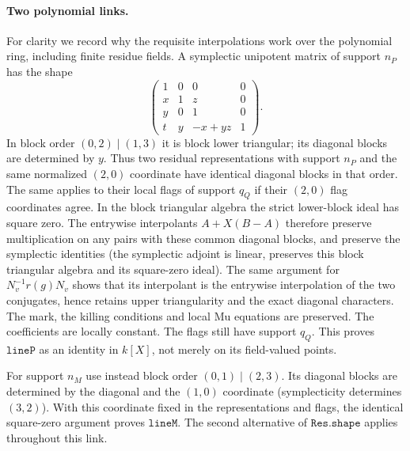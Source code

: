 \paragraph{Two polynomial links.}
For clarity we record why the requisite interpolations work
over the polynomial ring, including finite residue fields.
A symplectic unipotent matrix of support \(n_P\) has the shape
\[
 \begin{pmatrix}
 1&0&0&0\\x&1&z&0\\y&0&1&0\\t&y&-x+yz&1
 \end{pmatrix}.
\]
In block order \((0,2)\mid(1,3)\) it is block lower triangular;
its diagonal blocks are determined by \(y\). Thus two
residual representations with support \(n_P\) and the
same normalized \((2,0)\) coordinate have identical
diagonal blocks in that order. The same applies to their
local flags of support \(q_Q\) if their \((2,0)\) flag
coordinates agree. In the block triangular algebra the
strict lower-block ideal has square zero. The entrywise
interpolants \(A+X(B-A)\) therefore preserve multiplication
on any pairs with these common diagonal blocks, and preserve
the symplectic identities (the symplectic adjoint is linear,
preserves this block triangular algebra and its square-zero
ideal). The same argument for \(N_v^{-1}r(g)N_v\) shows
that its interpolant is the entrywise interpolation of the
two conjugates, hence retains upper triangularity and the
exact diagonal characters. The mark, the killing conditions
and local \(\mathrm{Mu}\) equations are preserved. The
coefficients are locally constant. The flags still have
support \(q_Q\). This proves \(\texttt{lineP}\) as an
identity in \(k[X]\), not merely on its field-valued points.

For support \(n_M\) use instead block order \((0,1)\mid(2,3)\).
Its diagonal blocks are determined by the diagonal and the
\((1,0)\) coordinate (symplecticity determines \((3,2)\)).
With this coordinate fixed in the representations and flags,
the identical square-zero argument proves \(\texttt{lineM}\).
The second alternative of \(\texttt{Res.shape}\) applies
throughout this link.

